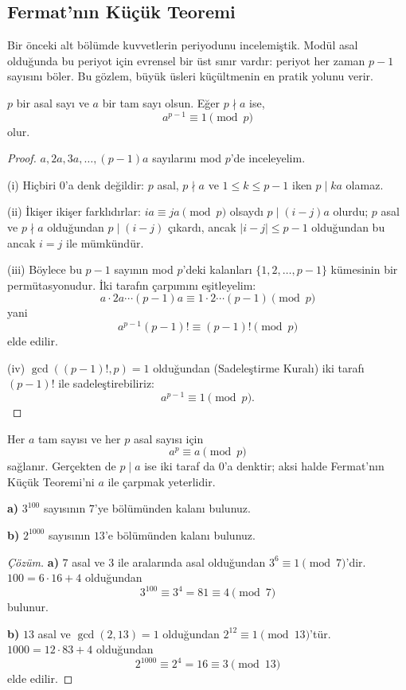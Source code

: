 \subsection{Fermat'nın Küçük Teoremi}

Bir önceki alt bölümde kuvvetlerin periyodunu incelemiştik. Modül asal olduğunda bu periyot için evrensel bir üst sınır vardır: periyot her zaman $p-1$ sayısını böler. Bu gözlem, büyük üsleri küçültmenin en pratik yolunu verir.

\begin{theorem}
$p$ bir asal sayı ve $a$ bir tam sayı olsun. Eğer $p \nmid a$ ise,
\[ a^{p-1} \equiv 1 \pmod p \]
olur.
\end{theorem}

\begin{proof}
$a, 2a, 3a, \dots, (p-1)a$ sayılarını mod $p$'de inceleyelim.

(i) Hiçbiri $0$'a denk değildir: $p$ asal, $p \nmid a$ ve $1 \le k \le p-1$ iken $p \mid ka$ olamaz.

(ii) İkişer ikişer farklıdırlar: $ia \equiv ja \pmod p$ olsaydı $p \mid (i-j)a$ olurdu; $p$ asal ve $p \nmid a$ olduğundan $p \mid (i-j)$ çıkardı, ancak $|i-j| \le p-1$ olduğundan bu ancak $i = j$ ile mümkündür.

(iii) Böylece bu $p-1$ sayının mod $p$'deki kalanları $\{1, 2, \dots, p-1\}$ kümesinin bir permütasyonudur. İki tarafın çarpımını eşitleyelim:
\[ a \cdot 2a \cdots (p-1)a \equiv 1 \cdot 2 \cdots (p-1) \pmod p \]
yani
\[ a^{p-1}(p-1)! \equiv (p-1)! \pmod p \]
elde edilir.

(iv) $\gcd((p-1)!, p) = 1$ olduğundan (Sadeleştirme Kuralı) iki tarafı $(p-1)!$ ile sadeleştirebiliriz:
\[ a^{p-1} \equiv 1 \pmod p. \]
\end{proof}

\begin{corollary}
Her $a$ tam sayısı ve her $p$ asal sayısı için
\[ a^p \equiv a \pmod p \]
sağlanır. Gerçekten de $p \mid a$ ise iki taraf da $0$'a denktir; aksi halde Fermat'nın Küçük Teoremi'ni $a$ ile çarpmak yeterlidir.
\end{corollary}

\begin{example}
\textbf{a)} $3^{100}$ sayısının $7$'ye bölümünden kalanı bulunuz.

\textbf{b)} $2^{1000}$ sayısının $13$'e bölümünden kalanı bulunuz.
\end{example}

\begin{proof}[Çözüm]
\textbf{a)} $7$ asal ve $3$ ile aralarında asal olduğundan $3^{6} \equiv 1 \pmod 7$'dir. $100 = 6 \cdot 16 + 4$ olduğundan
\[ 3^{100} \equiv 3^{4} = 81 \equiv 4 \pmod 7 \]
bulunur.

\textbf{b)} $13$ asal ve $\gcd(2, 13) = 1$ olduğundan $2^{12} \equiv 1 \pmod{13}$'tür. $1000 = 12 \cdot 83 + 4$ olduğundan
\[ 2^{1000} \equiv 2^{4} = 16 \equiv 3 \pmod{13} \]
elde edilir.
\end{proof}

